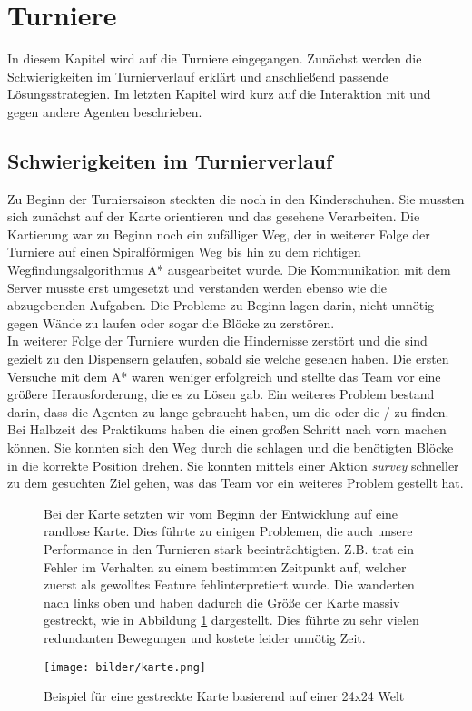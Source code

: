 \section{Turniere}
In diesem Kapitel wird auf die Turniere eingegangen. Zunächst werden die Schwierigkeiten im Turnierverlauf erklärt und anschließend passende Lösungsstrategien. Im letzten Kapitel wird kurz auf die Interaktion mit und gegen andere Agenten beschrieben.

\subsection{Schwierigkeiten im Turnierverlauf}
Zu Beginn der Turniersaison steckten die \Agents noch in den Kinderschuhen. Sie mussten sich zunächst auf der Karte orientieren und das gesehene Verarbeiten. Die Kartierung war zu Beginn noch ein zufälliger Weg, der in weiterer Folge der Turniere auf einen Spiralförmigen Weg bis hin zu dem richtigen Wegfindungsalgorithmus A* ausgearbeitet wurde. Die Kommunikation mit dem Server musste erst umgesetzt und verstanden werden ebenso wie die abzugebenden Aufgaben. Die Probleme zu Beginn lagen darin, nicht unnötig gegen Wände zu laufen oder sogar die Blöcke zu zerstören. \\

In weiterer Folge der Turniere wurden die Hindernisse zerstört und die \Agents sind gezielt zu den Dispensern gelaufen, sobald sie welche gesehen haben. Die ersten Versuche mit dem A* waren weniger erfolgreich und stellte das Team vor eine größere Herausforderung, die es zu Lösen gab. Ein weiteres Problem bestand darin, dass die Agenten zu lange gebraucht haben, um die \Dispenser oder die \GoalZones / \RoleZones zu finden. \\

Bei Halbzeit des Praktikums haben die \Agents einen großen Schritt nach vorn machen können. Sie konnten sich den Weg durch die \Obstacles schlagen und die benötigten Blöcke in die korrekte Position drehen. Sie konnten mittels einer Aktion \textit{survey} schneller zu dem gesuchten Ziel gehen, was das Team vor ein weiteres Problem gestellt hat. \\

\begin{figure}
	\begin{minipage}{0.5\textwidth}
	Bei der Karte setzten wir vom Beginn der Entwicklung auf eine randlose Karte. Dies führte zu einigen Problemen, die auch unsere Performance in den Turnieren stark beeinträchtigten. Z.B. trat ein Fehler im Verhalten zu einem bestimmten Zeitpunkt auf, welcher zuerst als gewolltes Feature fehlinterpretiert wurde. Die \Agents wanderten nach links oben und haben dadurch die Größe der Karte massiv gestreckt, wie in Abbildung \ref{fig:kartenwiederholung} dargestellt. Dies führte zu sehr vielen redundanten Bewegungen und kostete leider unnötig Zeit.
	\end{minipage}
	\begin{minipage}{0.4\textwidth}
	\texttt{[image: bilder/karte.png]}
	\caption{Beispiel für eine gestreckte Karte basierend auf einer 24x24 Welt }
	\label{fig:kartenwiederholung}
	\end{minipage}
\end{figure}

